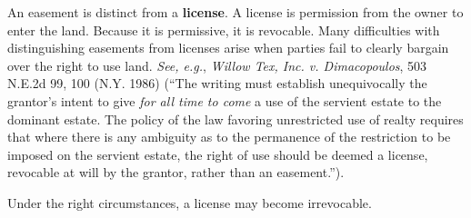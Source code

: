 An easement is distinct from a \textbf{license}. A license is permission from
the owner to enter the land. Because it is permissive, it is revocable. Many
difficulties with distinguishing easements from licenses arise when parties fail
to clearly bargain over the right to use land. \textit{See, e.g.}, \emph{Willow
Tex, Inc. v. Dimacopoulos}, 503 N.E.2d 99, 100 (N.Y. 1986) (``The writing must
establish unequivocally the grantor's intent to give \textit{for all time
to come} a use of the servient estate to the dominant estate. The policy of the
law favoring unrestricted use of realty requires that where there is any
ambiguity as to the permanence of the restriction to be imposed on the servient
estate, the right of use should be deemed a license, revocable at will by the
grantor, rather than an easement.'').  

Under the right circumstances, a license may become irrevocable. 

